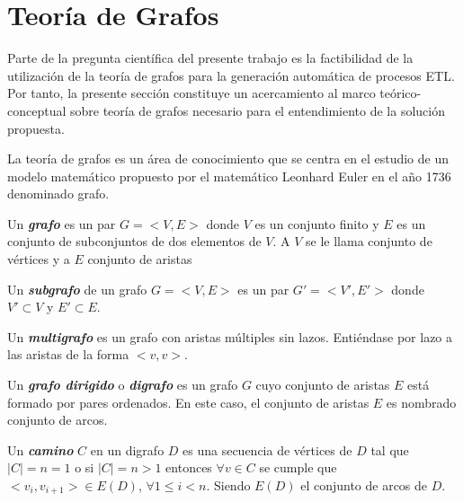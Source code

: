 \section{Teor\'ia de Grafos}\label{section:graphs}

Parte de la pregunta cient\'ifica del presente trabajo es la factibilidad de la utilización de la teoría de 
grafos para la generación automática de procesos ETL. Por tanto, la presente secci\'on constituye un acercamiento 
al marco te\'orico-conceptual sobre teoría de grafos necesario para el entendimiento de la solución propuesta.

La teoría de grafos es un \'area de conocimiento que se centra en el estudio de un modelo matemático 
propuesto por el matemático Leonhard Euler en el año 1736 denominado grafo\cite{estrada2012structure}.

\begin{definition}
    Un \textbf{\textit{grafo}} es un par $G = <V, E>$ donde $V$ es un conjunto finito y $E$ es un 
    conjunto de subconjuntos de dos elementos de $V$. A $V$ se le llama conjunto de v\'ertices y 
    a $E$ conjunto de aristas
\end{definition}

\begin{definition}
    Un \textbf{\textit{subgrafo}} de un grafo $G=<V,E>$ es un par $G'=<V',E'>$ donde $V' \subset V$ y 
    $E' \subset E$.
\end{definition}

\begin{definition}
    Un \textbf{\textit{multigrafo}} es un grafo con aristas m\'ultiples sin lazos. Entiéndase por 
    lazo a las aristas de la forma $<v,v>$.
\end{definition}

\begin{definition}
    Un \textbf{\textit{grafo dirigido}} o \textbf{\textit{digrafo}} es un grafo $G$ cuyo conjunto de 
    aristas $E$ est\'a formado por pares ordenados. En este caso, el conjunto de aristas $E$ es nombrado 
    conjunto de arcos.
\end{definition}

\begin{definition}
    Un \textbf{\textit{camino}} $C$ en un digrafo $D$ es una secuencia de v\'ertices de $D$ tal que $|C| = n = 1$ 
    o si $|C| = n > 1$ entonces $\forall v \in C$ se cumple que $<v_i , v_{i+1}> \in E(D)$, $\forall 1 \leq i < n$.
    Siendo $E(D)$ el conjunto de arcos de $D$.  
\end{definition}

